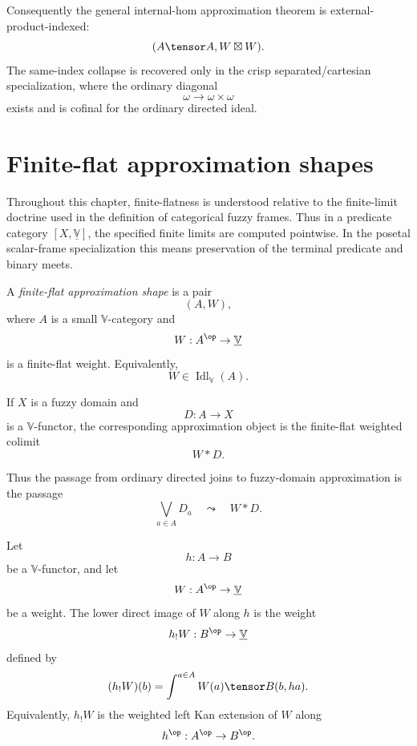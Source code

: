Consequently the general internal-hom approximation theorem is
external-product-indexed:
\[
    (A\tensor A,W\boxtimes W).
\]
The same-index collapse is recovered only in the crisp separated/cartesian
specialization, where the ordinary diagonal
\[
    \omega\to\omega\times\omega
\]
exists and is cofinal for the ordinary directed ideal.

\section{Finite-flat approximation shapes}
\label{sec:finite-flat-approximation-shapes}

Throughout this chapter, finite-flatness is understood relative to the
finite-limit doctrine used in the definition of categorical fuzzy frames.  Thus
in a predicate category \([X,\underline{\mathbb V}]\), the specified finite
limits are computed pointwise.  In the posetal scalar-frame specialization this
means preservation of the terminal predicate and binary meets.

\begin{definition}
\label{def:finite-flat-approximation-shape}
A \emph{finite-flat approximation shape} is a pair
\[
    (A,W),
\]
where \(A\) is a small \(\mathbb V\)-category and
\[
    W:A^{\op}\to\underline{\mathbb V}
\]
is a finite-flat weight.  Equivalently,
\[
    W\in\operatorname{Idl}_{\mathbb V}(A).
\]

If \(X\) is a fuzzy domain and
\[
    D:A\to X
\]
is a \(\mathbb V\)-functor, the corresponding approximation object is the
finite-flat weighted colimit
\[
    W*D.
\]
\end{definition}

Thus the passage from ordinary directed joins to fuzzy-domain approximation is
the passage
\[
    \bigvee_{a\in A}D_a
    \quad\leadsto\quad
    W*D.
\]

\begin{definition}
\label{def:lower-direct-image-weight-rde}
Let
\[
    h:A\to B
\]
be a \(\mathbb V\)-functor, and let
\[
    W:A^{\op}\to\underline{\mathbb V}
\]
be a weight.  The lower direct image of \(W\) along \(h\) is the weight
\[
    h_!W:B^{\op}\to\underline{\mathbb V}
\]
defined by
\[
    (h_!W)(b)
    =
    \int^{a\in A}
        W(a)\tensor B(b,ha).
\]
Equivalently, \(h_!W\) is the weighted left Kan extension of \(W\) along
\[
    h^{\op}:A^{\op}\to B^{\op}.
\]
\end{definition}

